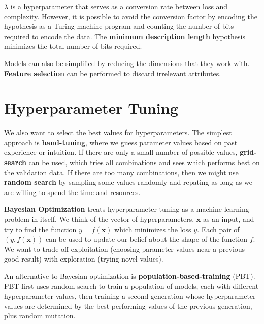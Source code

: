 \documentclass{article}
\begin{document}
$\lambda$ is a hyperparameter that serves as a conversion rate between loss and
complexity. However, it is possible to avoid the conversion factor by encoding the
hypothesis as a Turing machine program and counting the number of bits required to
encode the data. The \textbf{minimum description length} hypothesis minimizes the total
number of bits required.

Models can also be simplified by reducing the dimensions that they work
with. \textbf{Feature selection} can be performed to discard irrelevant attributes.

\section{Hyperparameter Tuning}

We also want to select the best values for hyperparameters. The simplest approach is
\textbf{hand-tuning}, where we guess parameter values based on past experience or intuition.
If there are only a small number of possible values, \textbf{grid-search} can be used,
which tries all combinations and sees which performs best on the validation data. If
there are too many combinations, then we might use \textbf{random search} by sampling
some values randomly and repating as long as we are willing to spend the time and
resources.

\textbf{Bayesian Optimization} treats hyperparameter tuning as a machine learning problem
in itself. We think of the vector of hyperparameters, $\textbf{x}$ as an input, and
try to find the function $y = f(\textbf{x})$ which minimizes the loss $y$. Each pair
of $(y, f(\textbf{x}))$ can be used to update our belief about the shape of the
function $f$. We want to trade off exploitation (choosing parameter values near a
previous good result) with exploration (trying novel values).

An alternative to Bayesian optimization is \textbf{population-based-training} (PBT). PBT
first uses random search to train a population of models, each with different
hyperparameter values, then training a second generation whose hyperparameter values
are determined by the best-performing values of the previous generation, plus random
mutation. 
\end{document}
